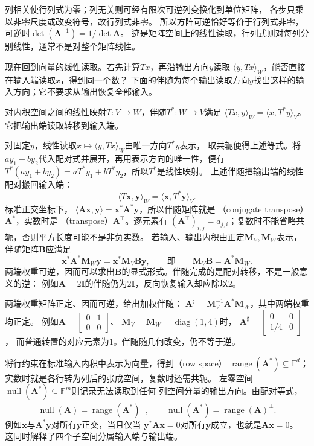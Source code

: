 列相关使行列式为零；列无关则可经有限次可逆列变换化到单位矩阵，
各步只乘以非零尺度或改变符号，故行列式非零。
所以方阵可逆恰好等价于行列式非零，可逆时$\det(\bm A^{-1})=1/\det\bm A$。
迹是矩阵空间上的线性读取，行列式则对每列分别线性，通常不是对整个矩阵线性。

现在回到向量的线性读取。若先计算$T x$，再沿输出方向$y$读取
$\langle y,Tx\rangle_W$，能否直接在输入端读取$x$，得到同一个数？
下面的伴随为每个输出读取方向$y$找出这样的输入方向；它不要求从输出恢复全部输入。
\begin{definition}[有限维伴随]
\label{def:linear-algebra-adjoint}
对内积空间之间的线性映射$T:V\to W$，伴随$T^*:W\to V$满足
$\langle Tx,y\rangle_W=\langle x,T^*y\rangle_V$。
它把输出端读取转移到输入端。
\end{definition}
对固定$y$，线性读取$x\mapsto\langle y,Tx\rangle_W$由唯一方向$T^*y$表示，
取共轭便得上述等式。将$ay_1+by_2$代入配对式并展开，再用表示方向的唯一性，便有
$T^*(ay_1+by_2)=aT^*y_1+bT^*y_2$，所以$T^*$是线性映射。
上述伴随把输出端的线性配对搬回输入端：
\[
 \langle T\bm x,\bm y\rangle_W=\langle\bm x,T^*\bm y\rangle_V.
\]
标准正交坐标下，
$\langle\bm A\bm x,\bm y\rangle=\bm x^*\bm A^*\bm y$，所以伴随矩阵就是
（conjugate transpose）$\bm A^*$，实数时是
（transpose）$\bm A^\top$。逐元素有
$(\bm A^\top)_{i,j}=a_{j,i}$；复数时不能省略共轭，否则平方长度可能不是非负实数。
若输入、输出内积由正定$\bm M_V,\bm M_W$表示，伴随矩阵$\bm B$应满足
\[
 \bm x^*\bm A^*\bm M_W\bm y=\bm x^*\bm M_V\bm B\bm y,
 \qquad\text{即}\qquad \bm M_V\bm B=\bm A^*\bm M_W.
\]
两端权重可逆，因而可以求出$\bm B$的显式形式。伴随完成的是配对转移，不是一般意义的逆：
例如$\bm A=2\bm I$的伴随仍为$2\bm I$，反向恢复输入却应除以$2$。


两端权重矩阵正定、因而可逆，给出加权伴随：
$\bm A^\sharp=\bm M_V^{-1}\bm A^*\bm M_W$，其中两端权重均正定。
例如$\bm A=\left[\begin{smallmatrix}0&1\\0&0\end{smallmatrix}\right]$、
$\bm M_V=\bm M_W=\operatorname{diag}(1,4)$时，
$\bm A^\sharp=\left[\begin{smallmatrix}0&0\\1/4&0\end{smallmatrix}\right]$，
而普通转置的对应元素为$1$。伴随随几何改变，仍不等于逆。


将行约束在标准输入内积中表示为向量，得到（row space）
$\operatorname{range}(\bm A^*)\subseteq\mathbb F^d$；
实数时就是各行转为列后的张成空间，复数时还需共轭。
左零空间$\operatorname{null}(\bm A^*)\subseteq\mathbb F^m$则记录无法读取到任何
列空间分量的输出方向。由配对等式，
\[
 \operatorname{null}(\bm A)=\operatorname{range}(\bm A^*)^\perp,\qquad
 \operatorname{null}(\bm A^*)=\operatorname{range}(\bm A)^\perp.
\]
例如$\bm x$与$\bm A^*\bm y$对所有$\bm y$正交，当且仅当
$\bm y^*\bm A\bm x=0$对所有$\bm y$成立，也就是$\bm A\bm x=0$。
这同时解释了四个子空间分属输入端与输出端。


